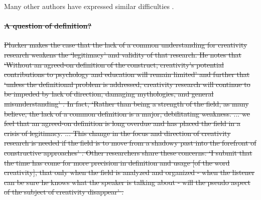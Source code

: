 \documentclass[10pt,letterpaper]{article}
\begin{document}
Many other authors have expressed similar difficulties \cite{rhodes61,sternberg99a,kaufman09}. 
%



\paragraph{\sout{A question of definition?}}

\sout{Plucker makes the case that the lack of a common understanding for creativity research weakens the `legitimacy' and validity of that research. He notes that `Without an agreed-on definition of the construct, creativity's potential contributions to psychology and education will remain limited' \cite[p.87]{plucker04defn} and further that  `unless the definitional problem is addressed, creativity research will continue to be impeded by lack of direction, damaging mythologies, and general misunderstanding' \cite[p.92]{plucker04defn}. In fact, `Rather than being a strength of the field, as many believe, the lack of a common definition is a major, debilitating weakness. ... we feel that an agreed-on definition is long overdue and has placed the field in a crisis of legitimacy. ... This change in the focus and direction of creativity research is needed if the field is to move from a shadowy past into the forefront of constructive approaches' \cite[p. 93]{plucker04defn}. Other researchers share these concerns: `I submit that the time has come for more precision in definition and usage [of the word creativity], that only when the field is analyzed and organized - when the listener can be sure he knows what the speaker is talking about - will the pseudo aspect of the subject of creativity disappear' \cite[p. 310]{rhodes61}.} 
\end{document}
